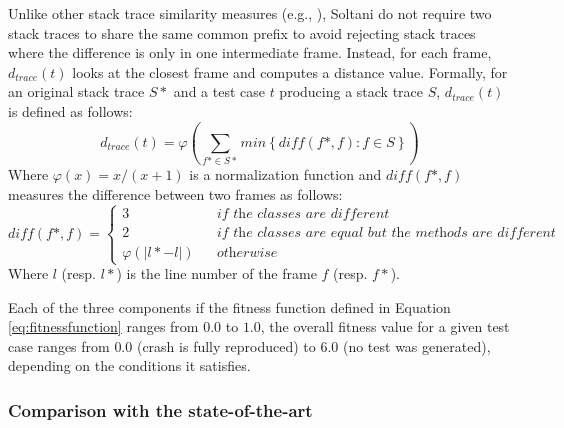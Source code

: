 Unlike other stack trace similarity measures (e.g., \cite{Rossler2013}), Soltani \etal \cite{Soltani2018a} do not require two stack traces to share the same common prefix to avoid rejecting stack traces where the difference is only in one intermediate frame. Instead, for each frame, $d_{trace}(t)$ looks at the closest frame and computes a distance value. Formally, for an original stack trace $S*$ and a test case $t$ producing a stack trace $S$, $d_{trace}(t)$ is defined as follows:
%
\begin{equation}
d_{trace}(t) = \varphi \left( \sum_{f* \in S*} min \left\lbrace \mathit{diff}(f*, f) : f \in S \right\rbrace \right)
\end{equation}
%
Where $\varphi (x) = x / (x+1)$ is a normalization function \cite{McMinn2004} and $\mathit{diff}(f*, f)$ measures the difference between two frames as follows: 
%
\begin{equation}
\mathit{diff}(f*, f) = 
\left\{
  \begin{array}{lcr}
    3 && \textit{if the classes are different}\\
    2  && \textit{if the classes are equal but the methods are different}\\
     \varphi \left( \vert l* - l \vert \right)   && \textit{otherwise}
  \end{array}
\right.
\end{equation}
%
Where $l$ (resp. $l*$) is the line number of the frame $f$ (resp. $f*$).

Each of the three components if the fitness function defined in Equation \ref{eq:fitnessfunction} ranges from $0.0$ to $1.0$, the overall fitness value for a given test case ranges from $0.0$ (crash is fully reproduced) to $6.0$ (no test was generated), depending on the conditions it satisfies. 

\subsubsection{Comparison with the state-of-the-art}

